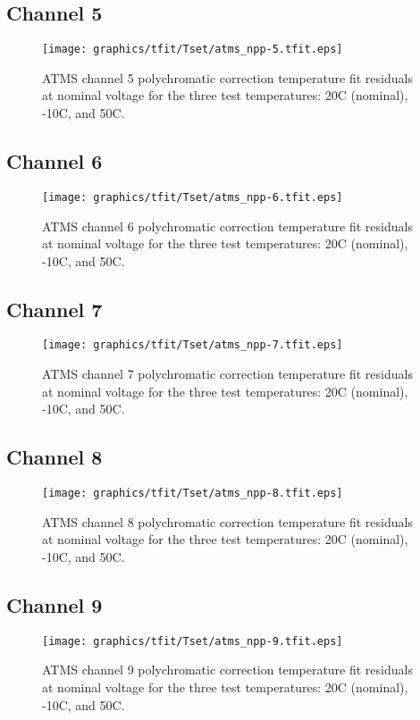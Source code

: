 \subsection{Channel 5}
\begin{figure}[H]
  \label{fig:Tset.ch5_tfit}
  \centering
  \texttt{[image: graphics/tfit/Tset/atms\_npp-5.tfit.eps]}
  \caption{ATMS channel 5 polychromatic correction temperature fit residuals at nominal voltage for the three test temperatures: 20\textdegree{}C (nominal), -10\textdegree{}C, and 50\textdegree{}C.}
\end{figure}

\subsection{Channel 6}
\begin{figure}[H]
  \label{fig:Tset.ch6_tfit}
  \centering
  \texttt{[image: graphics/tfit/Tset/atms\_npp-6.tfit.eps]}
  \caption{ATMS channel 6 polychromatic correction temperature fit residuals at nominal voltage for the three test temperatures: 20\textdegree{}C (nominal), -10\textdegree{}C, and 50\textdegree{}C.}
\end{figure}

\subsection{Channel 7}
\begin{figure}[H]
  \label{fig:Tset.ch7_tfit}
  \centering
  \texttt{[image: graphics/tfit/Tset/atms\_npp-7.tfit.eps]}
  \caption{ATMS channel 7 polychromatic correction temperature fit residuals at nominal voltage for the three test temperatures: 20\textdegree{}C (nominal), -10\textdegree{}C, and 50\textdegree{}C.}
\end{figure}

\subsection{Channel 8}
\begin{figure}[H]
  \label{fig:Tset.ch8_tfit}
  \centering
  \texttt{[image: graphics/tfit/Tset/atms\_npp-8.tfit.eps]}
  \caption{ATMS channel 8 polychromatic correction temperature fit residuals at nominal voltage for the three test temperatures: 20\textdegree{}C (nominal), -10\textdegree{}C, and 50\textdegree{}C.}
\end{figure}

\subsection{Channel 9}
\begin{figure}[H]
  \label{fig:Tset.ch9_tfit}
  \centering
  \texttt{[image: graphics/tfit/Tset/atms\_npp-9.tfit.eps]}
  \caption{ATMS channel 9 polychromatic correction temperature fit residuals at nominal voltage for the three test temperatures: 20\textdegree{}C (nominal), -10\textdegree{}C, and 50\textdegree{}C.}
\end{figure}

